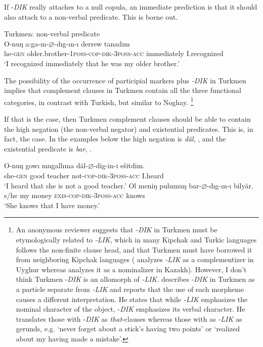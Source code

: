 \documentclass[output=paper]{langsci/langscibook}
\begin{document}
If -\textit{DIK} really attaches to a null copula, an immediate prediction is that it should also attach to a non-verbal predicate. 
This is borne out.

\ea Turkmen: non-verbal predicate \\%
    \label{kelepirex:key:24}
    \gll O-nuŋ a:ga-m-$\varnothing$-dıg-ın-ı derrew tanadım\\
    he-\textsc{gen}  older.brother-1\textsc{poss}-\textsc{cop}{}-\textsc{dik}{}-\textsc{3poss-acc} immediately I.recognized\\
    \glt `I recognized immediately that he was my older brother.'
\z

The possibility of the occurrence of participial markers plus \textit{-DIK} in Turkmen implies that complement clauses in Turkmen contain all the three functional categories, in contrast with Turkish, but similar to Noghay.%
    \footnote{%
        An anonymous reviewer suggests that -\textit{DIK} in Turkmen must be etymologically related to \textit{-LIK}, which in many Kipchak and Turkic languages follows the non-finite clause head, and that Turkmen must have borrowed it from neighboring Kipchak languages 
        (\citet{Asarina2011} analyzes \textit{-LIK} as a complementizer in Uyghur whereas \citet{OtottKovacs2018} analyzes it as a nominalizer in Kazakh).
        However, I don't think Turkmen -\textit{DIK} is an allomorph of \textit{{}-LIK}.
        \citet[480--483]{Clark1998} describes -\textit{DIK} in Turkmen as a particle separate from \textit{{}-LIK} and reports that the use of each morpheme causes a different interpretation. 
        He states that while \textit{{}-LIK} emphasizes the nominal character of the object, -\textit{DIK} emphasizes its verbal character. 
        He translates those with -\textit{DIK} as \textit{that}{}-clauses whereas those with as \textit{{}-LIK} as gerunds, 
        e.g. `never forget about a stick's having two points' or `realized about my having made a mistake'.
    } 

If that is the case, then Turkmen complement clauses should be able to contain the high negation (the non-verbal negator) and existential predicates. 
This is, in fact, the case. 
In the examples below the high negation is \textit{däl}, , and the existential predicate is \textit{bar}, .

\ea%
    \label{kelepirex:key:25}
    \gll O-nuŋ gowı mugallıma däl-$\varnothing$-dig-in-i ešitdim. \\
    she-\textsc{gen} good teacher       not-\textsc{cop}{}-\textsc{dik{}-3poss-acc} I.heard \\
    \glt `I heard that she is not a good teacher.'
\ex %
    \label{kelepirex:key:26}
    \gll Ol meniŋ pulumuŋ bar-$\varnothing$-dıg-ın-ı bilyär. \\
    s/he my       money    \textsc{exis}{}-\textsc{cop}{}-\textsc{dik{}-3poss-acc}  knows\\
    \glt `She knows that I have money.'
\z
\end{document}
